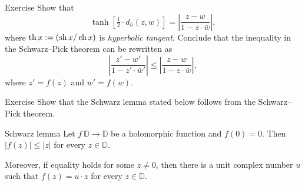 \begin{thm}{Exercise}\label{ex:schwarz-tanh}
Show that 
\[\tanh [\tfrac12\cdot d_h(z,w)]=\left|\frac{z-w}{1-z\cdot\bar w}\right|,\]
where $\operatorname{th} x:=(\operatorname{sh} x/\operatorname{ch} x)$ is \emph{hyperbolic tangent}.
Conclude that the inequality in the Schwarz--Pick theorem can be rewritten as
\[\left|\frac{z'-w'}{1-z'\cdot\bar w'}\right|\le\left|\frac{z-w}{1-z\cdot\bar w}\right|,\]
where
$z'=f(z)$ and $w'=f(w)$.
\end{thm}

\begin{thm}{Exercise}\label{ex:schwarz}
Show that the Schwarz lemma stated below 
follows from the Schwarz--Pick theorem.
\end{thm}

\begin{thm}{Schwarz lemma}
Let $f\: \mathbb{D}\to \mathbb{D}$ be a holomorphic function
and $f(0)=0$.
Then 
$|f(z)|\le |z|$
for every $z\in \mathbb{D}$.

Moreover, if equality holds for some $z\ne 0$, then there is a unit complex number $u$ 
such that 
$f(z)=u\cdot z$
for every $z\in\mathbb{D}$.
\end{thm}
